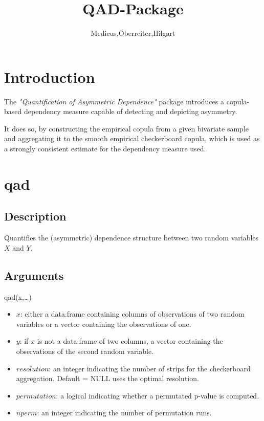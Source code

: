 \documentclass{scrartcl}\usepackage[]{graphicx}\usepackage[]{color}
\author{Medicus,Oberreiter,Hilgart}
\begin{document}
\title{QAD-Package}

\maketitle

\tableofcontents

\section{Introduction}

The \textit{"Quantification of Asymmetric Dependence"} package introduces a copula-based dependency measure capable of detecting and depicting asymmetry.

It does so, by constructing the empirical copula from a given bivariate sample and aggregating it to the smooth empirical checkerboard copula, which is used as a strongly consistent estimate for the dependency measure used.

\section{qad}

\subsection{Description}

Quantifies the (asymmetric) dependence structure between two random variables $X$ and $Y$.

\subsection{Arguments}
qad(x,\dots)

\begin{itemize}
  \item $x$: either a data.frame containing columns of observations of two random variables or a vector containing the observations of one.
  \item $y$: if $x$ is not a data.frame of two columns, a vector containing the observations of the second random variable.
  \item $resolution$: an integer indicating the number of strips for the checkerboard aggregation. Default = NULL uses the optimal resolution.
  \item $permutation$: a logical indicating whether a permutated p-value is computed.
  \item $nperm$: an integer indicating the number of permutation runs.
\end{itemize}
\end{document}
